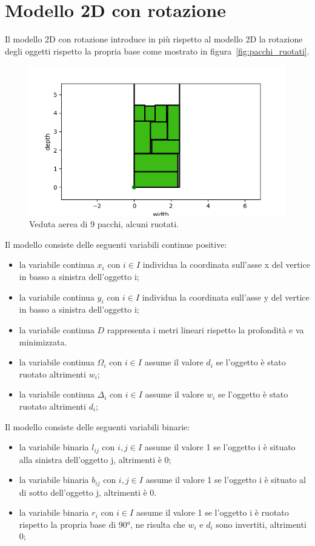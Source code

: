 \section{Modello 2D con rotazione}
Il modello 2D con rotazione introduce in più rispetto al modello 2D la rotazione degli oggetti rispetto la propria base come mostrato in figura~\eqref{fig:pacchi_ruotati}.
\begin{figure}[H]
	\begin{center} \includegraphics[scale=0.6]{figures/2dr}
		\caption[Pacchi ruotati]{Veduta aerea di 9 pacchi, alcuni ruotati.}
		\label{fig:pacchi_ruotati}
	\end{center}
\end{figure}

\noindent Il modello consiste delle seguenti variabili continue positive:
\begin{itemize}
	\item la variabile continua $x_{i}$ con $i \in I$ individua la coordinata sull'asse x del vertice in basso a sinistra dell'oggetto i;
	\item la variabile continua $y_{i}$ con $i \in I$ individua la coordinata sull'asse y del vertice in basso a sinistra dell'oggetto i;
	\item la variabile continua $D$ rappresenta i metri lineari rispetto la profondità e va minimizzata.
	\item la variabile continua $\Omega_{i}$ con $i \in I$ assume il valore $d_i$ se l'oggetto è stato ruotato altrimenti $w_i$;
	\item la variabile continua $\Delta_{i}$ con $i \in I$ assume il valore $w_i$ se l'oggetto è stato ruotato altrimenti $d_i$;
\end{itemize}
Il modello consiste delle seguenti variabili binarie:
\begin{itemize}
	\item la variabile binaria $l_{ij}$ con $i,j \in I$ assume il valore 1 se l'oggetto i è situato alla sinistra dell'oggetto j, altrimenti è 0;
	\item la variabile binaria $b_{ij}$ con $i,j \in I$ assume il valore 1 se l'oggetto i è situato al di sotto dell'oggetto j, altrimenti è 0.
	\item la variabile binaria $r_{i}$ con $i \in I$ assume il valore 1 se l'oggetto i è ruotato rispetto la propria base di 90°, ne risulta che $w_{i}$ e $d_{i}$ sono invertiti, altrimenti 0;
\end{itemize}

